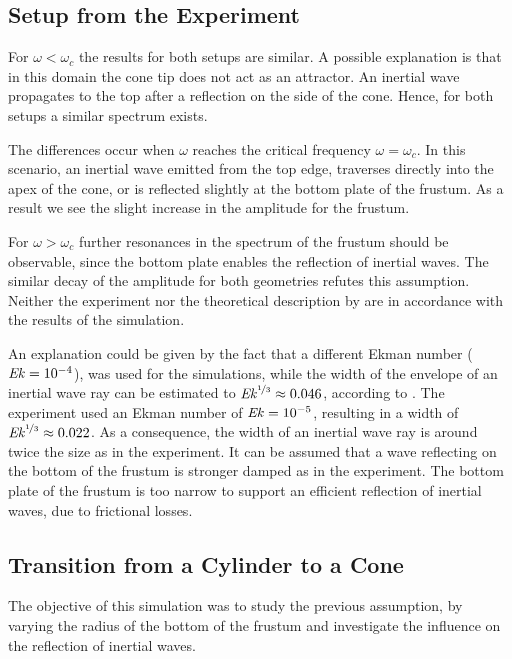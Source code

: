 \subsection{Setup from the Experiment}

For $\omega < \omega_c$ the results for both setups are similar.
A possible explanation is that in this domain the cone tip does not act as an attractor.
An inertial wave propagates to the top after a reflection on the side of the cone.
Hence, for both setups a similar spectrum exists.

The differences occur when $\omega$ reaches the critical frequency $\omega = \omega_c$. In this scenario, an inertial wave emitted from the
top edge, traverses directly into the apex of the cone, or is reflected slightly at the bottom plate of the frustum.
As a result we see the slight increase in the amplitude for the frustum.

For $\omega > \omega_c$ further resonances in the spectrum of the frustum should be observable,
since the bottom plate enables the reflection of inertial waves.
The similar decay of the amplitude for both geometries refutes this assumption.
Neither the experiment \citep{Beardsley1970} nor the theoretical description by \citep{Greenspan1990}
are in accordance with the results of the simulation.

An explanation could be given by the fact that a different Ekman number ($\mbox{\textit{Ek}} = 10^{-4}$), was used for the simulations,
while the width of the envelope of an inertial wave ray can be estimated to $\mbox{\textit{Ek}}^{\nicefrac{1}{3}}\approx 0.046$, according to \citep{Tilgner2000}.
The experiment used an Ekman number of $\mbox{\textit{Ek}} = 10^{-5}$, resulting in a  width of $\mbox{\textit{Ek}}^{\nicefrac{1}{3}}\approx 0.022$.
As a consequence, the width of an inertial wave ray is around twice the size as in the experiment.
It can be assumed that a wave reflecting on the bottom of the frustum
is stronger damped as in the experiment.
The bottom plate of the frustum is too narrow to support an efficient reflection
of inertial waves, due to frictional losses.\\

\subsection{Transition from a Cylinder to a Cone}

The objective of this simulation was to study the previous assumption,
by varying the radius of the bottom of the frustum and investigate the influence
on the reflection of inertial waves.

